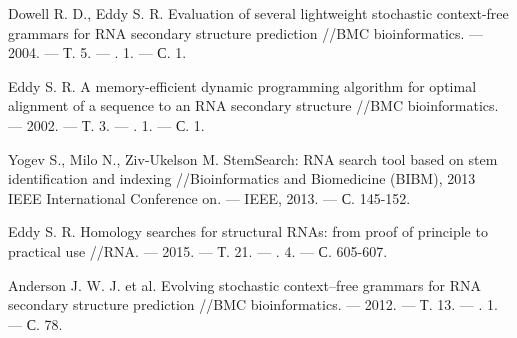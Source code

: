 \documentclass[a5paper]{article}
\begin{document}
\begin{thebibliography}{99}
  
Dowell R. D., Eddy S. R. Evaluation of several lightweight stochastic context-free grammars for RNA 
secondary structure prediction //BMC bioinformatics. --- 2004. --- Т. 5. --- \textnumero. 1. --- С. 1.

Eddy S. R. A memory-efficient dynamic programming algorithm for optimal alignment of a sequence to 
an RNA secondary structure //BMC bioinformatics. --- 2002. --- Т. 3. --- \textnumero. 1. --- С. 1.

Yogev S., Milo N., Ziv-Ukelson M. StemSearch: RNA search tool based on stem identification and indexing //Bioinformatics and Biomedicine (BIBM), 2013 IEEE International Conference on. --- IEEE, 2013. --- С. 145-152.

Eddy S. R. Homology searches for structural RNAs: from proof of principle to practical use //RNA. --- 2015. --- Т. 21. --- \textnumero. 4. --- С. 605-607.

Anderson J. W. J. et al. Evolving stochastic context--free grammars for RNA secondary structure prediction //BMC bioinformatics. --- 2012. --- Т. 13. --- \textnumero. 1. --- С. 78.



\end{thebibliography}
\end{document}
